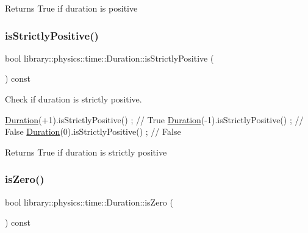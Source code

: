 \begin{DoxyReturn}{Returns}
True if duration is positive 
\end{DoxyReturn}
\mbox{\label{classlibrary_1_1physics_1_1time_1_1_duration_a2d4f7691e997232d4d9b88e7d4ab49d7}} 
\subsubsection{\texorpdfstring{is\+Strictly\+Positive()}{isStrictlyPositive()}}
{\footnotesize\ttfamily bool library\+::physics\+::time\+::\+Duration\+::is\+Strictly\+Positive (\begin{DoxyParamCaption}{ }\end{DoxyParamCaption}) const}



Check if duration is strictly positive. 


\begin{DoxyCode}
\hyperlink{classlibrary_1_1physics_1_1time_1_1_duration_a0a70efcf487a841da572afcf00001f64}{Duration}(+1).isStrictlyPositive() ; \textcolor{comment}{// True}
\hyperlink{classlibrary_1_1physics_1_1time_1_1_duration_a0a70efcf487a841da572afcf00001f64}{Duration}(-1).isStrictlyPositive() ; \textcolor{comment}{// False}
\hyperlink{classlibrary_1_1physics_1_1time_1_1_duration_a0a70efcf487a841da572afcf00001f64}{Duration}(0).isStrictlyPositive() ; \textcolor{comment}{// False}
\end{DoxyCode}


\begin{DoxyReturn}{Returns}
True if duration is strictly positive 
\end{DoxyReturn}
\mbox{\label{classlibrary_1_1physics_1_1time_1_1_duration_a7f14980ea22f7e9cad122f7a37ba50be}} 
\subsubsection{\texorpdfstring{is\+Zero()}{isZero()}}
{\footnotesize\ttfamily bool library\+::physics\+::time\+::\+Duration\+::is\+Zero (\begin{DoxyParamCaption}{ }\end{DoxyParamCaption}) const}



